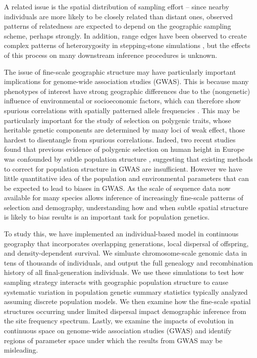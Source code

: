 \documentclass[11pt,twoside,lineno]{preprint}
\newif\ifcomments
\newcommand{\cjb}[1]{\ifcomments{{\color{orange} \it (#1)}}\else{}\fi}
\begin{document}
A related issue is the spatial distribution of sampling effort --
since nearby individuals are more likely to be closely related than distant ones,
observed patterns of relatedness are expected to depend on the geographic sampling scheme,
perhaps strongly.
In addition, range edges have been observed to create complex patterns of heterozygosity in stepping-stone simulations \citep{Neel2013,Shirk2014}, 
but the effects of this process on many downstream inference procedures is unknown.
\cjb{must be more out there on sampling -- any recs for papers to read+cite?}

The issue of fine-scale geographic structure may have particularly important implications for genome-wide association studies (GWAS). 
This is because many phenotypes of interest have strong geographic differences due to the (nongenetic) influence of environmental or socioeconomic factors,
which can therefore show spurious correlations with spatially patterned allele frequencies \citep{Bulik-Sullivan2015,Mathieson2012}. 
This may be particularly important for the study of selection on polygenic traits,
whose heritable genetic components are determined by many loci of weak effect,
those hardest to disentangle from spurious correlations. 
Indeed, two recent studies found that previous evidence of polygenic selection on human height in Europe was confounded by subtle population structure \citep{Sohail2018,Berg2018}, suggesting that existing methods to correct for population structure in GWAS are insufficient. However we have little quantitative idea of the population and environmental parameters that can be expected to lead to biases in GWAS. As the scale of sequence data now available for many species allows inference of increasingly fine-scale patterns of selection and demography, understanding how and when subtle spatial structure is likely to bias results is an important task for population genetics.

To study this, we have implemented an individual-based model in continuous geography 
that incorporates overlapping generations, local dispersal of offspring, and density-dependent survival. 
We simluate chromosome-scale genomic data in tens of thousands of individuals, and output the full genealogy and recombination history of all final-generation individuals. 
We use these simulations to test how sampling strategy interacts with geographic population structure to cause systematic variation in population genetic summary statistics 
typically analyzed assuming discrete population models. 
We then examine how the fine-scale spatial structures occurring under limited dispersal impact demographic inference from the site frequency spectrum. 
Lastly, we examine the impacts of evolution in continuous space on genome-wide association studies (GWAS) and identify regions of parameter space under which the results from GWAS may be misleading.
\end{document}
